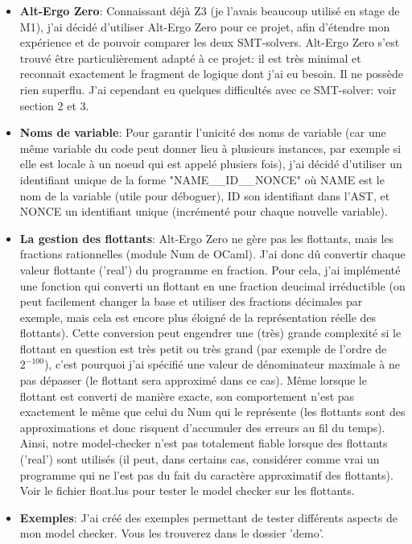 \documentclass[a4paper]{article}%
\begin{document}
\begin{itemize}
		\item \textbf{Alt-Ergo Zero}: Connaissant déjà Z3 (je l'avais beaucoup utilisé en stage de M1), j'ai décidé d'utiliser Alt-Ergo Zero pour ce projet,
		afin d'étendre mon expérience et de pouvoir comparer les deux SMT-solvers. Alt-Ergo Zero s'est trouvé être particulièrement adapté à ce projet:
		il est très minimal et reconnait exactement le fragment de logique dont j'ai eu besoin. Il ne possède rien superflu.
		J'ai cependant eu quelques difficultés avec ce SMT-solver: voir section 2 et 3.\\
		\item \textbf{Noms de variable}: Pour garantir l'unicité des noms de variable (car une même variable du code peut donner lieu à plusieurs instances,
		par exemple si elle est locale à un noeud qui est appelé plusiers fois), j'ai décidé d'utiliser un identifiant unique de la forme "NAME\_\_ID\_\_NONCE"
		où NAME est le nom de la variable (utile pour déboguer), ID son identifiant dans l'AST, et NONCE un identifiant unique (incrémenté pour chaque nouvelle variable).\\
		\item \textbf{La gestion des flottants}: Alt-Ergo Zero ne gère pas les flottants, mais les fractions rationnelles (module Num de OCaml).
		J'ai donc dû convertir chaque valeur flottante ('real') du programme en fraction. Pour cela, j'ai implémenté une fonction qui converti un flottant en une fraction
		deucimal irréductible (on peut facilement changer la base et utiliser des fractions décimales par exemple, mais cela est encore plus éloigné de la représentation réelle des flottants).
		Cette conversion peut engendrer une (très) grande complexité si le flottant en question est très petit ou très grand (par exemple de l'ordre de $2^{-100}$),
		c'est pourquoi j'ai spécifié une valeur de dénominateur maximale à ne pas dépasser (le flottant sera approximé dans ce cas).
		Même lorsque le flottant est converti de manière exacte, son comportement n'est pas exactement le même que celui du Num qui le représente
		(les flottants sont des approximations et donc risquent d'accumuler des erreurs au fil du temps).
		Ainsi, notre model-checker n'est pas totalement fiable lorsque des flottants ('real') sont utilisés (il peut, dans certains cas, considérer comme vrai
		un programme qui ne l'est pas du fait du caractère approximatif des flottants). Voir le fichier float.lus pour tester le model checker sur les flottants.\\
		\item \textbf{Exemples}: J'ai créé des exemples permettant de tester différents aspects de mon model checker. Vous les trouverez dans le dossier 'demo'. 
	\end{itemize}
\end{document}
